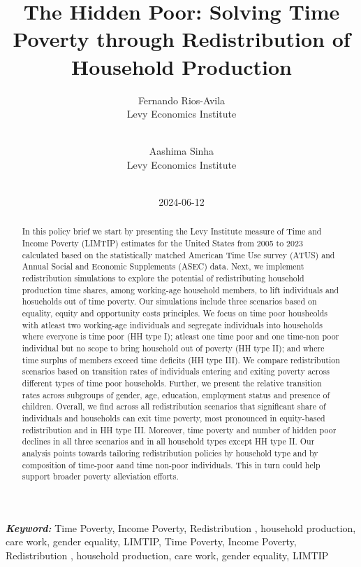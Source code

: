 \documentclass[
  11pt,
]{article}
\title{The Hidden Poor: Solving Time Poverty through Redistribution of
Household Production}
\author{
Fernando Rios-Avila\\
Levy Economics Institute\\
\\
\and 
Aashima Sinha\\
Levy Economics Institute\\
\\
}
\date{2024-06-12}
\begin{document}
\def\spacingset#1{\renewcommand{\baselinestretch}%
{#1}\small\normalsize} \spacingset{1}


\maketitle
\begin{abstract}
In this policy brief we start by presenting the Levy Institute measure
of Time and Income Poverty (LIMTIP) estimates for the United States from
2005 to 2023 calculated based on the statistically matched American Time
Use survey (ATUS) and Annual Social and Economic Supplements (ASEC)
data. Next, we implement redistribution simulations to explore the
potential of redistributing household production time shares, among
working-age household members, to lift individuals and hosueholds out of
time poverty. Our simulations include three scenarios based on equality,
equity and opportunity costs principles. We focus on time poor
housheolds with atleast two working-age individuals and segregate
individuals into households where everyone is time poor (HH type I);
atleast one time poor and one time-non poor individual but no scope to
bring household out of poverty (HH type II); and where time surplus of
members exceed time deficits (HH type III). We compare redistribution
scenarios based on transition rates of individuals entering and exiting
poverty across different types of time poor households. Further, we
present the relative transition rates across subgroups of gender, age,
education, employment status and presence of children. Overall, we find
across all redistribution scenarios that significant share of
individuals and households can exit time poverty, most pronounced in
equity-based redistribution and in HH type III. Moreover, time poverty
and number of hidden poor declines in all three scenarios and in all
household types except HH type II. Our analysis points towards tailoring
redistribution policies by household type and by composition of
time-poor aand time non-poor individuals. This in turn could help
support broader poverty alleviation efforts.
\end{abstract}
 
\vspace{.2in}

\textbf{\textit{Keyword: }}
    Time Poverty, Income Poverty, Redistribution , household production,
care work, gender equality, LIMTIP, 
    Time Poverty, Income Poverty, Redistribution , household production,
care work, gender equality, LIMTIP 
\end{document}
